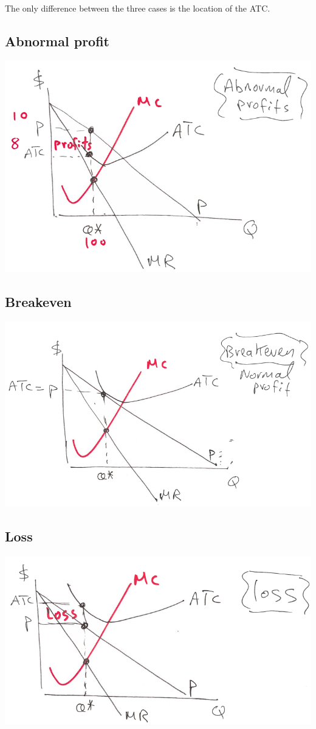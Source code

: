 \documentclass[../ECON-281-Notes.tex]{subfiles}
\begin{document}
The only difference between the three cases is the location of the ATC.
\newpage
\subsection{Abnormal profit}
\includegraphics[width=\columnwidth]{assets/image_2021-11-23-12-10-51.png}

\subsection{Breakeven}
\includegraphics[width=\columnwidth]{assets/image_2021-11-23-12-11-32.png}

\subsection{Loss}
\includegraphics[width=\columnwidth]{assets/image_2021-11-23-12-11-51.png}
\end{document}
